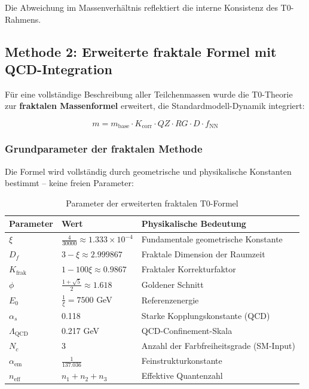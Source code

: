 	Die Abweichung im Massenverhältnis reflektiert die interne Konsistenz des T0-Rahmens.

	\subsection{Methode 2: Erweiterte fraktale Formel mit QCD-Integration}
	
	Für eine vollständige Beschreibung aller Teilchenmassen wurde die T0-Theorie zur \textbf{fraktalen Massenformel} erweitert, die Standardmodell-Dynamik integriert:
	
	\begin{equation}
		\boxed{m = m_{\text{base}} \cdot K_{\text{corr}} \cdot QZ \cdot RG \cdot D \cdot f_{\text{NN}}}
		\label{eq:t0_fractal_mass}
	\end{equation}
	
	\subsubsection{Grundparameter der fraktalen Methode}
	
	Die Formel wird vollständig durch geometrische und physikalische Konstanten bestimmt -- keine freien Parameter:
	
	\begin{table}[h]
		\centering
		\small
		\begin{tabular}{lll}
			\toprule
			\textbf{Parameter} & \textbf{Wert} & \textbf{Physikalische Bedeutung} \\
			\midrule
			$\xi$ & $\frac{4}{30000} \approx 1.333 \times 10^{-4}$ & Fundamentale geometrische Konstante \\
			$D_f$ & $3 - \xi \approx 2.999867$ & Fraktale Dimension der Raumzeit \\
			$K_{\text{frak}}$ & $1 - 100\xi \approx 0.9867$ & Fraktaler Korrekturfaktor \\
			$\phi$ & $\frac{1 + \sqrt{5}}{2} \approx 1.618$ & Goldener Schnitt \\
			$E_0$ & $\frac{1}{\xi} = 7500$ GeV & Referenzenergie \\
			$\alpha_s$ & 0.118 & Starke Kopplungskonstante (QCD) \\
			$\Lambda_{\text{QCD}}$ & 0.217 GeV & QCD-Confinement-Skala \\
			$N_c$ & 3 & Anzahl der Farbfreiheitsgrade (SM-Input) \\
			$\alpha_{\text{em}}$ & $\frac{1}{137.036}$ & Feinstrukturkonstante \\
			$n_{\text{eff}}$ & $n_1 + n_2 + n_3$ & Effektive Quantenzahl \\
			\bottomrule
		\end{tabular}
		\caption{Parameter der erweiterten fraktalen T0-Formel}
		\label{tab:fractal_params}
	\end{table}
	
